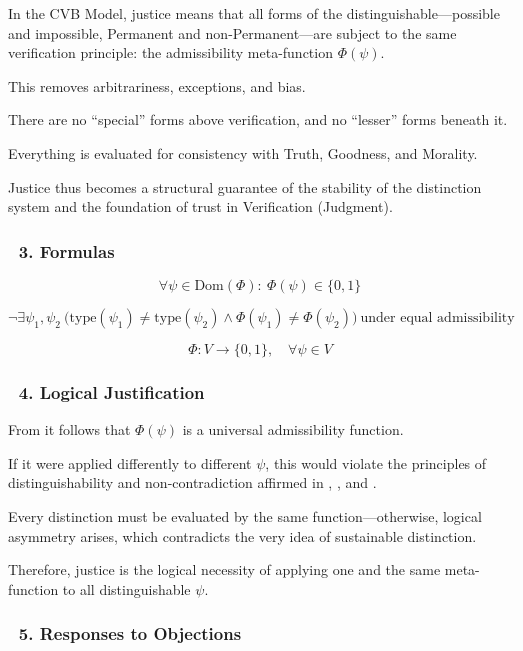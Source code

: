 \documentclass[12pt]{article}
\begin{document}
In the CVB Model, justice means that all forms of the distinguishable—possible and impossible, Permanent and non-Permanent—are subject to the same verification principle: the admissibility meta-function $\Phi(\psi)$.

This removes arbitrariness, exceptions, and bias.

There are no ``special'' forms above verification, and no ``lesser'' forms beneath it.

Everything is evaluated for consistency with Truth, Goodness, and Morality.

Justice thus becomes a structural guarantee of the stability of the distinction system and the foundation of trust in Verification (Judgment).

\subsubsection*{🔹 3. Formulas}

\[
\forall \psi \in \text{Dom}(\Phi):\ \Phi(\psi) \in \{0,1\}
\]

\[
\neg \exists \psi_1, \psi_2\ \bigl(\text{type}(\psi_1) \ne \text{type}(\psi_2) \land \Phi(\psi_1) \ne \Phi(\psi_2)\bigr) \ \text{under equal admissibility}
\]

\[
\Phi : V \rightarrow \{0,1\},\quad \forall \psi \in V
\]

\subsubsection*{🔹 4. Logical Justification}

From \text{[11.1.1]} it follows that $\Phi(\psi)$ is a universal admissibility function.

If it were applied differently to different $\psi$, this would violate the principles of distinguishability and non-contradiction affirmed in \text{[5]}, \text{[11.2]}, and \text{[11.3]}.

Every distinction must be evaluated by the same function—otherwise, logical asymmetry arises, which contradicts the very idea of sustainable distinction.

Therefore, justice is the logical necessity of applying one and the same meta-function to all distinguishable $\psi$.

\subsubsection*{🔹 5. Responses to Objections}
\end{document}
